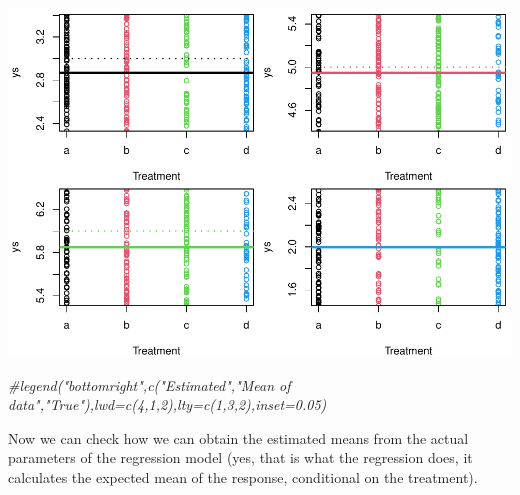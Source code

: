 \documentclass[
]{book}
\newenvironment{Shaded}{\begin{snugshade}}{\end{snugshade}}
\newcommand{\AttributeTok}[1]{\textcolor[rgb]{0.13,0.29,0.53}{#1}}
\newcommand{\CommentTok}[1]{\textcolor[rgb]{0.56,0.35,0.01}{\textit{#1}}}
\newcommand{\DecValTok}[1]{\textcolor[rgb]{0.00,0.00,0.81}{#1}}
\newcommand{\FunctionTok}[1]{\textcolor[rgb]{0.13,0.29,0.53}{\textbf{#1}}}
\newcommand{\NormalTok}[1]{#1}
\newcommand{\SpecialCharTok}[1]{\textcolor[rgb]{0.81,0.36,0.00}{\textbf{#1}}}
\newcommand{\StringTok}[1]{\textcolor[rgb]{0.31,0.60,0.02}{#1}}
\begin{document}
\begin{Shaded}
\end{Shaded}

\includegraphics{ECOMODbook_files/figure-latex/a8.33-1.pdf}

\begin{Shaded}
\begin{Highlighting}[]
\CommentTok{\#legend("bottomright",c("Estimated","Mean of data","True"),lwd=c(4,1,2),lty=c(1,3,2),inset=0.05)}
\end{Highlighting}
\end{Shaded}

Now we can check how we can obtain the estimated means from the actual parameters of the regression model (yes, that is what the regression does, it calculates the expected mean of the response, conditional on the treatment).
\end{document}
